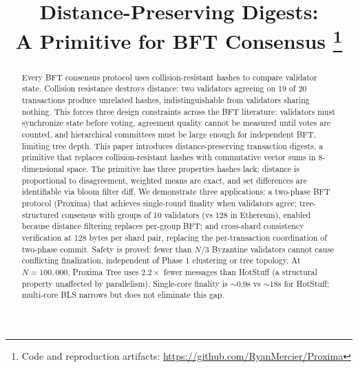 \documentclass[conference]{IEEEtran}
\begin{document}
\title{Distance-Preserving Digests:\\ A Primitive for BFT Consensus
\thanks{Code and reproduction artifacts: \url{https://github.com/RyanMercier/Proxima}}
}

\author{
}

\maketitle

\begin{abstract}
Every BFT consensus protocol uses collision-resistant hashes to compare validator state. Collision resistance destroys distance: two validators agreeing on 19 of 20 transactions produce unrelated hashes, indistinguishable from validators sharing nothing. This forces three design constraints across the BFT literature: validators must synchronize state before voting, agreement quality cannot be measured until votes are counted, and hierarchical committees must be large enough for independent BFT, limiting tree depth. This paper introduces distance-preserving transaction digests, a primitive that replaces collision-resistant hashes with commutative vector sums in 8-dimensional space. The primitive has three properties hashes lack: distance is proportional to disagreement, weighted means are exact, and set differences are identifiable via bloom filter diff. We demonstrate three applications: a two-phase BFT protocol (Proxima) that achieves single-round finality when validators agree; tree-structured consensus with groups of 10 validators (vs 128 in Ethereum), enabled because distance filtering replaces per-group BFT; and cross-shard consistency verification at 128 bytes per shard pair, replacing the per-transaction coordination of two-phase commit. Safety is proved: fewer than $N/3$ Byzantine validators cannot cause conflicting finalization, independent of Phase 1 clustering or tree topology. At $N{=}100{,}000$, Proxima Tree uses $2.2\times$ fewer messages than HotStuff (a structural property unaffected by parallelism). Single-core finality is $\sim\!0.9$s vs $\sim\!18$s for HotStuff; multi-core BLS narrows but does not eliminate this gap.
\end{abstract}
\end{document}
